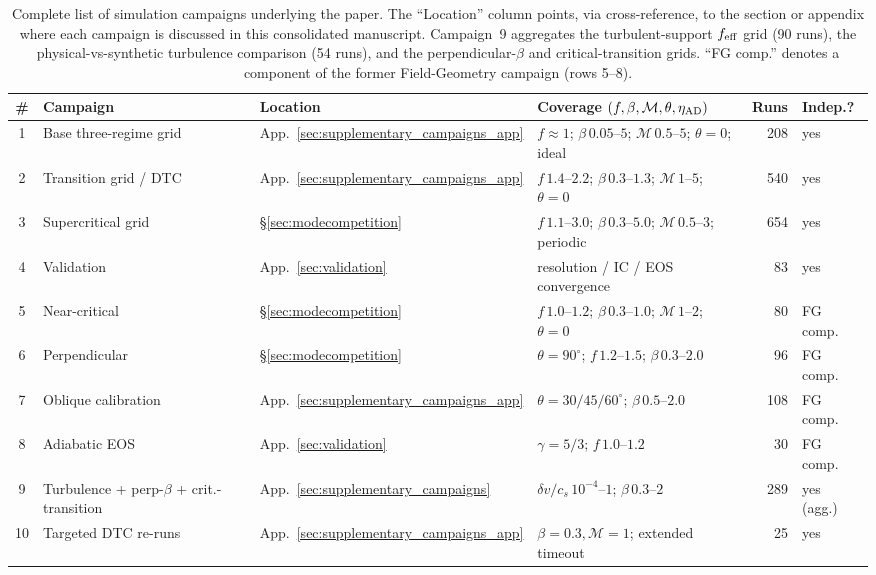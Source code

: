 \documentclass[usenatbib,twoside,twocolumn]{mnras}
\begin{document}
\begin{table}
\caption{Complete list of simulation campaigns underlying the paper. The ``Location'' column points, via cross-reference, to the section or appendix where each campaign is discussed in this consolidated manuscript. Campaign~9 aggregates the turbulent-support $f_{\rm eff}$ grid (90 runs), the physical-vs-synthetic turbulence comparison (54 runs), and the perpendicular-$\beta$ and critical-transition grids. ``FG comp.'' denotes a component of the former Field-Geometry campaign (rows 5--8).}
\label{tab:campaigns}
\footnotesize
\setlength{\tabcolsep}{4pt}
\renewcommand{\arraystretch}{1.2}
\begin{tabular}{@{}c p{3.4cm} l p{4.0cm} r l@{}}
\toprule
\# & Campaign & Location & Coverage $(f,\beta,\mathcal{M},\theta,\eta_{\rm AD})$ & Runs & Indep.? \\
\midrule
1  & Base three-regime grid & App.~\ref{sec:supplementary_campaigns_app} & $f\approx1$; $\beta\,0.05$--$5$; $\mathcal{M}\,0.5$--$5$; $\theta=0$; ideal & 208 & yes \\
2  & Transition grid / DTC & App.~\ref{sec:supplementary_campaigns_app} & $f\,1.4$--$2.2$; $\beta\,0.3$--$1.3$; $\mathcal{M}\,1$--$5$; $\theta=0$ & 540 & yes \\
3  & Supercritical grid & \S\ref{sec:modecompetition} & $f\,1.1$--$3.0$; $\beta\,0.3$--$5.0$; $\mathcal{M}\,0.5$--$3$; periodic & 654 & yes \\
4  & Validation & App.~\ref{sec:validation} & resolution / IC / EOS convergence & 83 & yes \\
5  & Near-critical & \S\ref{sec:modecompetition} & $f\,1.0$--$1.2$; $\beta\,0.3$--$1.0$; $\mathcal{M}\,1$--$2$; $\theta=0$ & 80 & FG comp. \\
6  & Perpendicular & \S\ref{sec:modecompetition} & $\theta=90^\circ$; $f\,1.2$--$1.5$; $\beta\,0.3$--$2.0$ & 96 & FG comp. \\
7  & Oblique calibration & App.~\ref{sec:supplementary_campaigns_app} & $\theta=30/45/60^\circ$; $\beta\,0.5$--$2.0$ & 108 & FG comp. \\
8  & Adiabatic EOS & App.~\ref{sec:validation} & $\gamma=5/3$; $f\,1.0$--$1.2$ & 30 & FG comp. \\
9  & Turbulence + perp-$\beta$ + crit.-transition & App.~\ref{sec:supplementary_campaigns} & $\delta v/c_s\,10^{-4}$--$1$; $\beta\,0.3$--$2$ & 289 & yes (agg.) \\
10 & Targeted DTC re-runs & App.~\ref{sec:supplementary_campaigns_app} & $\beta=0.3,\mathcal{M}=1$; extended timeout & 25 & yes \\

\end{tabular}
\end{table}
\end{document}

